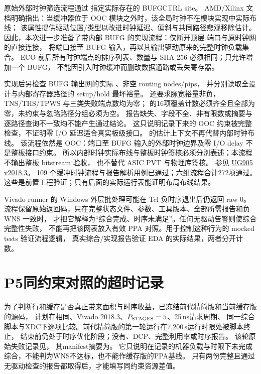 原始外部时钟筛选流程通过  指定实际存在的 BUFGCTRL site。
AMD/Xilinx 文档明确指出：当缓冲器位于 OOC 模块之外时，该全局时钟不在模块实现中实际布线；
该属性提供驱动位置/类型以改进时钟延迟、偏斜与共同路径悲观移除估计。
因此，本次进一步准备了带内部 BUFG 的实现流程：仅断开顶层  端口与原时钟网的直接连接，
将端口接至 BUFG 输入，再以其输出驱动原来的完整时钟负载集合。
ECO 前后所有时钟端点的排序列表、数量与 SHA-256 必须相同；只允许增加一个 BUFG，
不能因引入时钟缓冲而删改数据通路或丢失寄存器。

实现后另检查 BUFG 输出网的实际 、非空 routing nodes/pips，
并分别读取全设计与内部寄存器路径的 setup/hold 最坏裕量。
还要求脉宽裕量非负，TNS/THS/TPWS 与三类失败端点数均为零；
 的16项覆盖计数必须齐全且全部为零，未约束与忽略路径分组必须为空。
报告缺失、字段不全、非有限数或摘要与逐路径查询不一致均不能产生通过结论。
这只说明记录下来的 OOC 约束被完整检查，不证明零 I/O 延迟适合真实板级接口。
 的估计上下文不再代替内部时钟布线。
该流程依然是 OOC：端口至 BUFG 输入的外部时钟边界及零 I/O delay 不是整板接口约束。
所以内部时钟实际布线与整板时钟签核必须分别表述；本流程不输出整板 bitstream 验收，
也不替代 ASIC PVT 与物理库签核。
参见 \href{https://docs.amd.com/api/khub/documents/dUZkF9u9qQ4x4MtRgpH9aQ/content}{UG905 v2018.3}。
109 个缓冲时钟流程与报告解析用例已通过；六组流程合计272项通过。
这些是前置工程验证；只有后面的实际运行表能证明布局布线结果。

Vivado runner 的 Windows 外层批处理可能在 Tcl 负时序退出后仍返回 raw 0。
流程保留原始返回码，只在完整状态文件、参数、工具版本、全部所需报告和负 WNS 一致时，
才把它解释为“综合完成、时序未满足”。任何无驱动告警则使综合完整性失败，
不能再把该网表放入有效 PPA 对照。用于控制这种行为的 mocked tests 验证流程逻辑，
真实综合/实现报告验证 EDA 的实际结果，两者分开计数。



\section{P5同约束对照的超时记录}
为了判断行和缓存是否真正带来面积与时序收益，已冻结前代精简版和当前缓存版的源码，
计划在相同、Vivado 2018.3、\(P_{\rm STAGES}=5\)、25\,ns请求周期、
同一综合脚本与XDC下逐项比较。前代精简版的第一轮运行在7,200\,s运行时限处被脚本终止，
结束前仍处于时序优化阶段；没有、DCP、完整利用率或时序报告。
该轮原始失败记录见，
其manifest摘要为。
它只说明在记录的机器负载与时限下未完成综合，不能判为WNS不达标，也不能作缓存版的PPA基线。
只有两份完整且通过无驱动检查的报告都取得后，才能填写同约束资源差值。

